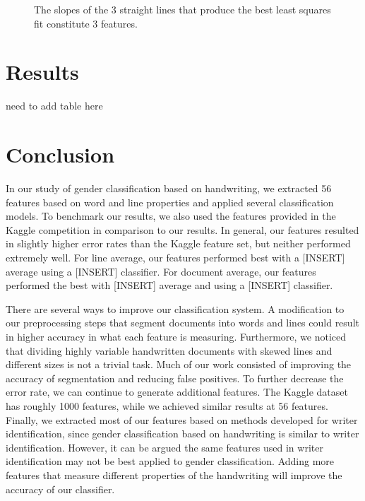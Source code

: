 \documentclass[paper=a4, fontsize=11pt]{scrartcl} %
\numberwithin{equation}{section} %
\numberwithin{figure}{section} %
\numberwithin{table}{section} %
\begin{document}
\begin{figure}
  \label{fig:fractaldimension}
  \caption{The slopes of the 3 straight lines that produce the best
    least squares fit constitute 3 features.}
\end{figure}

\section{Results}
need to add table here
\label{sec:results}
\section{Conclusion}
In our study of gender classification based on handwriting, we
extracted 56 features based on word and line properties and applied
several classification models. To benchmark our results, we also used
the features provided in the Kaggle competition in comparison to our
results. In general, our features resulted in slightly higher error
rates than the Kaggle feature set, but neither performed extremely
well. For line average, our features performed best with a [INSERT]
average using a [INSERT] classifier. For document average, our
features performed the best with [INSERT] average and using a [INSERT]
classifier.

There are several ways to improve our classification system. A
modification to our preprocessing steps that segment documents into
words and lines could result in higher accuracy in what each feature
is measuring. Furthermore, we noticed that dividing highly variable
handwritten documents with skewed lines and different sizes is not a
trivial task. Much of our work consisted of improving the accuracy of
segmentation and reducing false positives. To further decrease the
error rate, we can continue to generate additional features. The
Kaggle dataset has roughly 1000 features, while we achieved similar
results at 56 features. Finally, we extracted most of our features
based on methods developed for writer identification, since gender
classification based on handwriting is similar to writer
identification. However, it can be argued the same features used in
writer identification may not be best applied to gender
classification. Adding more features that measure different properties
of the handwriting will improve the accuracy of our classifier.



\end{document}
